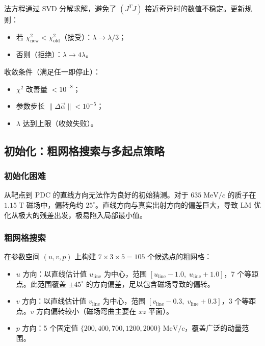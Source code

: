 \documentclass[a4paper, 11pt]{article}
\begin{document}
法方程通过 SVD 分解求解，避免了 $(J^TJ)$ 接近奇异时的数值不稳定。更新规则：
\begin{itemize}[nosep]
  \item 若 $\chi^2_\mathrm{new} < \chi^2_\mathrm{old}$（接受）：$\lambda \to \lambda / 3$；
  \item 否则（拒绝）：$\lambda \to 4\lambda$。
\end{itemize}

收敛条件（满足任一即停止）：
\begin{itemize}[nosep]
  \item $\chi^2$ 改善量 $< 10^{-8}$；
  \item 参数步长 $\|\Delta\vec{\alpha}\| < 10^{-5}$；
  \item $\lambda$ 达到上限（收敛失败）。
\end{itemize}

\subsection{初始化：粗网格搜索与多起点策略}
\label{sec:grid_search}

\subsubsection{初始化困难}

从靶点到 PDC 的直线方向无法作为良好的初始猜测。对于 $635\;\mathrm{MeV}/c$ 的质子在 $1.15\;\mathrm{T}$ 磁场中，偏转角约 $25^\circ$。直线方向与真实出射方向的偏差巨大，导致 LM 优化从极大的残差出发，极易陷入局部最小值。

\subsubsection{粗网格搜索}

在参数空间 $(u, v, p)$ 上构建 $7 \times 3 \times 5 = 105$ 个候选点的粗网格：
\begin{itemize}[nosep]
  \item $u$ 方向：以直线估计值 $u_\mathrm{line}$ 为中心，范围 $[u_\mathrm{line} - 1.0,\; u_\mathrm{line} + 1.0]$，7 个等距点。此范围覆盖 $\pm 45^\circ$ 的方向偏差，足以包含磁场导致的偏转。
  \item $v$ 方向：以直线估计值 $v_\mathrm{line}$ 为中心，范围 $[v_\mathrm{line} - 0.3,\; v_\mathrm{line} + 0.3]$，3 个等距点。$v$ 方向偏转较小（磁场弯曲主要在 $xz$ 平面）。
  \item $p$ 方向：5 个固定值 $\{200, 400, 700, 1200, 2000\}\;\mathrm{MeV}/c$，覆盖广泛的动量范围。
\end{itemize}
\end{document}
